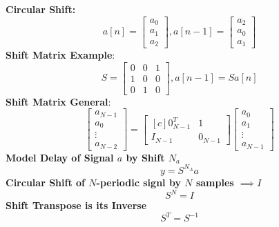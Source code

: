 \documentclass{article}\usepackage{amsmath,amssymb,amsthm,tikz,tkz-graph,color,chngpage,soul,hyperref,csquotes,graphicx,floatrow,framed,scrextend,mathtools,mathrsfs}\newcommand*{\QEDB}{\hfill\ensuremath{\square}}\newtheorem*{prop}{Proposition}\renewcommand{\theenumi}{\alph{enumi}}\usepackage[shortlabels]{enumitem}\usepackage[nobreak=true]{mdframed}\usetikzlibrary{matrix,calc}\MakeOuterQuote{"}\usepackage[margin=0.75in]{geometry} \newtheorem{theorem}{Theorem}\newcommand{\Z}{\mathbb Z}\newcommand{\R}{\mathbb R}\newcommand{\Q}{\mathbb Q}\newcommand{\N}{\mathbb N}\newcommand{\x}[1]{\textrm{#1}}\newcommand{\xs}[1]{\textrm{ #1 }}\newcommand{\pr}{\textrm{Pr}}
\newcommand{\eq}[1]{\begin{equation}#1\end{equation}}
\begin{document}
\begin{mdframed}
\textbf{Circular Shift:}\\
\eq{a[n]=\begin{bmatrix}a_0\\a_1\\a_2\end{bmatrix}, a[n-1]=\begin{bmatrix}a_2\\a_0\\a_1\end{bmatrix}}
\textbf{Shift Matrix Example}:
\eq{S=\begin{bmatrix}0&0&1\\1&0&0\\0&1&0\end{bmatrix}, a[n-1]=Sa[n]}
\textbf{Shift Matrix General}:
\eq{\begin{bmatrix}a_{N-1}\\a_0\\\vdots\\a_{N-2}\end{bmatrix}=\begin{bmatrix*}[c]0^T_{N-1}&1\\I_{N-1}&0_{N-1}\end{bmatrix*}\begin{bmatrix}a_0\\a_1\\\vdots\\a_{N-1}\end{bmatrix}}
\textbf{Model Delay of Signal $a$ by Shift $N_a$}
\eq{y=S^{N_A}a}
\textbf{Circular Shift of $N$-periodic signl by $N$ samples $\implies I$}
\eq{S^N=I}
\textbf{Shift Transpose is its Inverse}
\eq{S^T=S^{-1}}
\end{mdframed}
\end{document}
